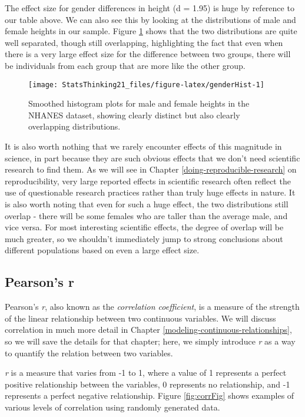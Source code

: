 \documentclass[]{book}
\theoremstyle{definition}
\theoremstyle{definition}
\theoremstyle{definition}
\theoremstyle{remark}
\begin{document}
The effect size for gender differences in height (d = 1.95) is huge by
reference to our table above. We can also see this by looking at the
distributions of male and female heights in our sample. Figure
\ref{fig:genderHist} shows that the two distributions are quite well
separated, though still overlapping, highlighting the fact that even
when there is a very large effect size for the difference between two
groups, there will be individuals from each group that are more like the
other group.

\begin{figure}
\texttt{[image: StatsThinking21\_files/figure-latex/genderHist-1]} \caption{Smoothed histogram plots for male and female heights in the NHANES dataset, showing clearly distinct but also clearly overlapping distributions.}\label{fig:genderHist}
\end{figure}

It is also worth nothing that we rarely encounter effects of this
magnitude in science, in part because they are such obvious effects that
we don't need scientific research to find them. As we will see in
Chapter \ref{doing-reproducible-research} on reproducibility, very large
reported effects in scientific research often reflect the use of
questionable research practices rather than truly huge effects in
nature. It is also worth noting that even for such a huge effect, the
two distributions still overlap - there will be some females who are
taller than the average male, and vice versa. For most interesting
scientific effects, the degree of overlap will be much greater, so we
shouldn't immediately jump to strong conclusions about different
populations based on even a large effect size.

\subsection{Pearson's r}\label{pearsons-r}

Pearson's \emph{r}, also known as the \emph{correlation coefficient}, is
a measure of the strength of the linear relationship between two
continuous variables. We will discuss correlation in much more detail in
Chapter \ref{modeling-continuous-relationships}, so we will save the
details for that chapter; here, we simply introduce \emph{r} as a way to
quantify the relation between two variables.

\emph{r} is a measure that varies from -1 to 1, where a value of 1
represents a perfect positive relationship between the variables, 0
represents no relationship, and -1 represents a perfect negative
relationship. Figure \ref{fig:corrFig} shows examples of various levels
of correlation using randomly generated data.
\end{document}
